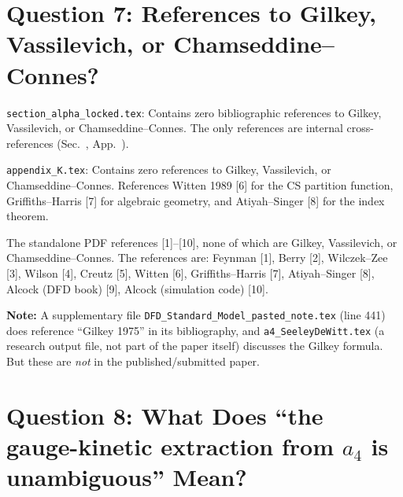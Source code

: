 \documentclass[12pt,a4paper]{article}
\begin{document}
\section{Question 7: References to Gilkey, Vassilevich, or Chamseddine--Connes?}
\label{sec:q7}

\begin{tcolorbox}[colback=yellow!5!white, colframe=yellow!50!black,
  title=Answer: NONE in section\_alpha\_locked.tex or appendix\_K.tex]

\texttt{section\_alpha\_locked.tex}: Contains zero bibliographic references
to Gilkey, Vassilevich, or Chamseddine--Connes.  The only references are
internal cross-references (Sec.~, App.~).

\texttt{appendix\_K.tex}: Contains zero references to Gilkey, Vassilevich,
or Chamseddine--Connes.  References Witten 1989 [6] for the CS partition
function, Griffiths--Harris [7] for algebraic geometry, and
Atiyah--Singer [8] for the index theorem.

The standalone PDF references [1]--[10], none of which are Gilkey,
Vassilevich, or Chamseddine--Connes.  The references are: Feynman [1],
Berry [2], Wilczek--Zee [3], Wilson [4], Creutz [5], Witten [6],
Griffiths--Harris [7], Atiyah--Singer [8], Alcock (DFD book) [9],
Alcock (simulation code) [10].

\textbf{Note:} A supplementary file
\texttt{DFD\_Standard\_Model\_pasted\_note.tex} (line 441) does reference
``Gilkey 1975'' in its bibliography, and \texttt{a4\_SeeleyDeWitt.tex}
(a research output file, not part of the paper itself) discusses the
Gilkey formula.  But these are \emph{not} in the published/submitted paper.
\end{tcolorbox}

\section{Question 8: What Does ``the gauge-kinetic extraction from $a_4$
  is unambiguous'' Mean?}
\label{sec:q8}
\end{document}
